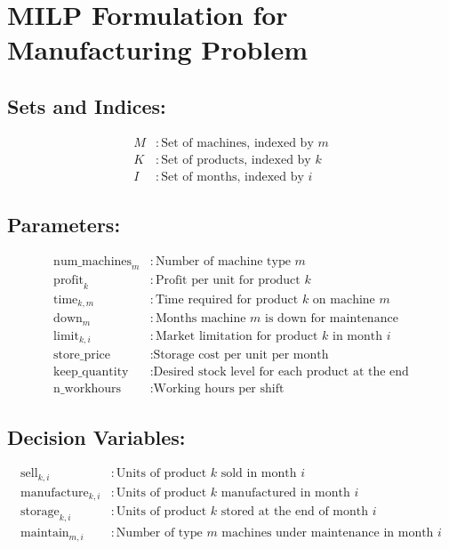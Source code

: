 \documentclass{article}
\begin{document}
\section*{MILP Formulation for Manufacturing Problem}

\subsection*{Sets and Indices:}
\begin{align*}
    M & : \text{Set of machines, indexed by } m \\
    K & : \text{Set of products, indexed by } k \\
    I & : \text{Set of months, indexed by } i
\end{align*}

\subsection*{Parameters:}
\begin{align*}
    \text{num\_machines}_m & : \text{Number of machine type } m \\
    \text{profit}_k & : \text{Profit per unit for product } k \\
    \text{time}_{k, m} & : \text{Time required for product } k \text{ on machine } m \\
    \text{down}_m & : \text{Months machine } m \text{ is down for maintenance} \\
    \text{limit}_{k, i} & : \text{Market limitation for product } k \text{ in month } i \\
    \text{store\_price} & : \text{Storage cost per unit per month} \\
    \text{keep\_quantity} & : \text{Desired stock level for each product at the end} \\
    \text{n\_workhours} & : \text{Working hours per shift}
\end{align*}

\subsection*{Decision Variables:}
\begin{align*}
    \text{sell}_{k, i} & : \text{Units of product } k \text{ sold in month } i \\
    \text{manufacture}_{k, i} & : \text{Units of product } k \text{ manufactured in month } i \\
    \text{storage}_{k, i} & : \text{Units of product } k \text{ stored at the end of month } i \\
    \text{maintain}_{m, i} & : \text{Number of type } m \text{ machines under maintenance in month } i
\end{align*}
\end{document}
